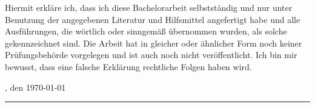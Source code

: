 
Hiermit erkl\"are ich, dass ich diese Bachelorarbeit selbstst\"andig und nur unter Benutzung der angegebenen Literatur und Hilfsmittel angefertigt habe und alle Ausf\"uhrungen, die w\"ortlich oder sinngem\"aß \"ubernommen wurden, als solche gekennzeichnet sind. 
Die Arbeit hat in gleicher oder \"ahnlicher Form noch keiner Prüfungsbeh\"orde vorgelegen und ist auch noch nicht ver\"offentlicht. 
Ich bin mir bewusst, dass eine falsche Erkl\"arung rechtliche Folgen haben wird.

\ort, den \today


\rule[-0.2cm]{5cm}{0.5pt}

\textsc{\autor} 
